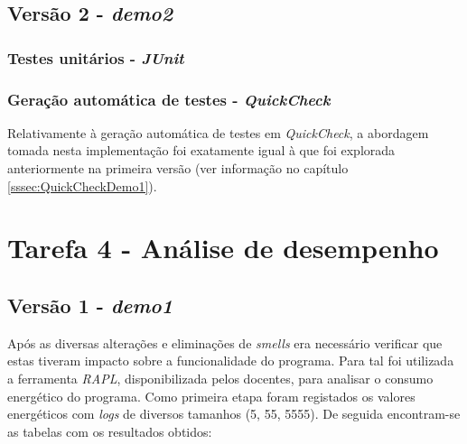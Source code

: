 \documentclass[a4paper]{report}
\begin{document}
\subsection{Versão 2 - \textit{demo2}}

\subsubsection{Testes unitários - \textit{JUnit}}


\subsubsection{Geração automática de testes - \textit{QuickCheck}}
Relativamente à geração automática de testes em \textit{QuickCheck}, a abordagem tomada nesta implementação foi exatamente igual à que foi explorada anteriormente na primeira versão (ver informação no capítulo \ref{sssec:QuickCheckDemo1}).

\section{Tarefa 4 - Análise de desempenho}
\subsection{Versão 1 - \textit{demo1}}
Após as diversas alterações e eliminações de \textit{smells} era necessário verificar que estas tiveram impacto sobre a funcionalidade do programa. Para tal foi utilizada a ferramenta \textit{RAPL}, disponibilizada pelos docentes, para analisar o consumo energético do programa. Como primeira etapa foram registados os valores energéticos com \textit{logs} de diversos tamanhos (5, 55, 5555). De seguida encontram-se as tabelas com os resultados obtidos:
\end{document}

